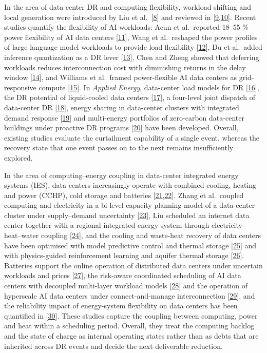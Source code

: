 \documentclass[a4paper,twocolumn,fleqn,10pt]{article}
\begin{document}
In the area of data-center DR and computing flexibility, workload shifting and local generation were introduced by Liu et al.~[\hyperlink{ref8}{8}] and reviewed in [\hyperlink{ref9}{9},\hyperlink{ref10}{10}]. Recent studies quantify the flexibility of AI workloads: Acun et al.~reported 18--55 \% power flexibility of AI data centers [\hyperlink{ref11}{11}], Wang et al.~reshaped the power profiles of large language model workloads to provide load flexibility [\hyperlink{ref12}{12}], Du et al.~added inference quantization as a DR lever [\hyperlink{ref13}{13}], Chen and Zheng showed that deferring workloads reduces interconnection cost with diminishing returns in the delay window [\hyperlink{ref14}{14}], and Williams et al.~framed power-flexible AI data centers as grid-responsive compute [\hyperlink{ref15}{15}]. In \emph{Applied Energy}, data-center load models for DR [\hyperlink{ref16}{16}], the DR potential of liquid-cooled data centers [\hyperlink{ref17}{17}], a four-level joint dispatch of data-center DR [\hyperlink{ref18}{18}], energy sharing in data-center clusters with integrated demand response [\hyperlink{ref19}{19}] and multi-energy portfolios of zero-carbon data-center buildings under proactive DR programs [\hyperlink{ref20}{20}] have been developed. Overall, existing studies evaluate the curtailment capability of a single event, whereas the recovery state that one event passes on to the next remains insufficiently explored.

In the area of computing--energy coupling in data-center integrated energy systems (IES), data centers increasingly operate with combined cooling, heating and power (CCHP), cold storage and batteries [\hyperlink{ref21}{21},\hyperlink{ref22}{22}]. Zhang et al.~coupled computing and electricity in a bi-level capacity planning model of a data-center cluster under supply--demand uncertainty [\hyperlink{ref23}{23}], Liu scheduled an internet data center together with a regional integrated energy system through electricity--heat--water coupling [\hyperlink{ref24}{24}], and the cooling and waste-heat recovery of data centers have been optimised with model predictive control and thermal storage [\hyperlink{ref25}{25}] and with physics-guided reinforcement learning and aquifer thermal storage [\hyperlink{ref26}{26}]. Batteries support the online operation of distributed data centers under uncertain workloads and prices [\hyperlink{ref27}{27}], the risk-aware coordinated scheduling of AI data centers with decoupled multi-layer workload models [\hyperlink{ref28}{28}] and the operation of hyperscale AI data centers under connect-and-manage interconnection [\hyperlink{ref29}{29}], and the reliability impact of energy-system flexibility on data centers has been quantified in [\hyperlink{ref30}{30}]. These studies capture the coupling between computing, power and heat within a scheduling period. Overall, they treat the computing backlog and the state of charge as internal operating states rather than as debts that are inherited across DR events and decide the next deliverable reduction.
\end{document}
